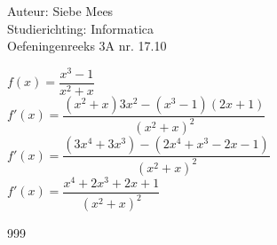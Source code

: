 \documentclass[a4paper]{article}
\begin{document}
  
\noindent \large Auteur: Siebe Mees \\
\noindent \large Studierichting: Informatica\\
\noindent \large Oefeningenreeks 3A nr. 17.10\\

\medskip

\normalsize

$f(x)=\dfrac{x^3-1}{x^2+x}$\\

$f'(x)=\dfrac{(x^2+x) 3x^2-(x^3-1)(2x+1)}{(x^2+x)^2}$\\

$f'(x)=\dfrac{(3x^4+3x^3)-(2x^4+x^3-2x-1)}{(x^2+x)^2}$\\

$f'(x)=\dfrac{x^4+2x^3+2x+1}{(x^2+x)^2}$\\


\begin{thebibliography}{999}
\end{thebibliography}
\end{document}
